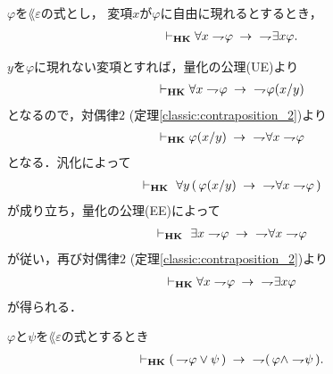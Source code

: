 	\begin{screen}
		\begin{thm}
		\label{classic:weak_De_Morgan_law_for_quantifier_2}
			$\varphi$を$\lang{\varepsilon}$の式とし，
			変項$x$が$\varphi$に自由に現れるとするとき，
			\begin{align}
				\vdash_{{\scriptsize \mbox{{\bf HK}}}} \forall x \rightharpoondown\hspace{-0.25em} \varphi
				\hspace{0.25em}\rightarrow\hspace{0.25em}\ \rightharpoondown\hspace{-0.25em} \exists x \varphi.
			\end{align}
		\end{thm}
	\end{screen}
	
	\begin{sketch}
		$y$を$\varphi$に現れない変項とすれば，量化の公理(UE)より
		\begin{align}
			\vdash_{{\scriptsize \mbox{{\bf HK}}}} \forall x \rightharpoondown\hspace{-0.25em} \varphi \hspace{0.25em}\rightarrow\hspace{0.25em}\ \rightharpoondown\hspace{-0.25em} \varphi(x/y)
		\end{align}
		となるので，対偶律$2$ (定理\ref{classic:contraposition_2})より
		\begin{align}
			\vdash_{{\scriptsize \mbox{{\bf HK}}}} \varphi(x/y) \hspace{0.25em}\rightarrow\hspace{0.25em}\ \rightharpoondown\hspace{-0.25em} \forall x \rightharpoondown\hspace{-0.25em} \varphi
		\end{align}
		となる．汎化によって
		\begin{align}
			\vdash_{{\scriptsize \mbox{{\bf HK}}}}\ \forall y\, (\, \varphi(x/y) \hspace{0.25em}\rightarrow\hspace{0.25em}\ \rightharpoondown\hspace{-0.25em} \forall x \rightharpoondown\hspace{-0.25em} \varphi\, )
		\end{align}
		が成り立ち，量化の公理(EE)によって
		\begin{align}
			\vdash_{{\scriptsize \mbox{{\bf HK}}}}\ \exists x \rightharpoondown\hspace{-0.25em} \varphi \hspace{0.25em}\rightarrow\hspace{0.25em}\ \rightharpoondown\hspace{-0.25em} \forall x \rightharpoondown\hspace{-0.25em} \varphi
		\end{align}
		が従い，再び対偶律$2$ (定理\ref{classic:contraposition_2})より
		\begin{align}
			\vdash_{{\scriptsize \mbox{{\bf HK}}}} \forall x \rightharpoondown\hspace{-0.25em} \varphi \hspace{0.25em}\rightarrow\hspace{0.25em}\ \rightharpoondown\hspace{-0.25em} \exists x \varphi
		\end{align}
		が得られる．
		\QED
	\end{sketch}
	
	\begin{screen}
		\begin{thm}
		\label{classic:De_Morgan_law_1}
			$\varphi$と$\psi$を$\lang{\varepsilon}$の式とするとき
			\begin{align}
				\vdash_{{\scriptsize \mbox{{\bf HK}}}} (\, \rightharpoondown\hspace{-0.25em} \varphi \vee \psi\, ) 
				\hspace{0.25em}\rightarrow\hspace{0.25em}\ \rightharpoondown\hspace{-0.25em} (\, \varphi \wedge \rightharpoondown\hspace{-0.25em} \psi\, ).
			\end{align}
		\end{thm}
	\end{screen}
	
